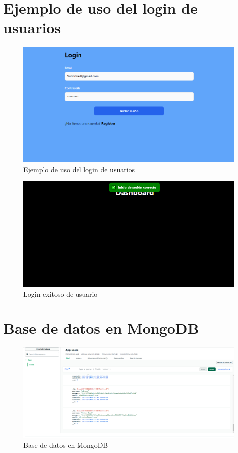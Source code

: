 \documentclass[12pt]{article}
\begin{document}
\section{Ejemplo de uso del login de usuarios}
\begin{figure}[H]
    \centering
    \includegraphics[width=1\textwidth]{./img/Login-example.png}
    \caption{Ejemplo de uso del login de usuarios}
    \label{fig:my_label}
\end{figure}

\begin{figure}[H]
    \centering
    \includegraphics[width=1\textwidth]{./img/Login-successfully.png}
    \caption{Login exitoso de usuario}
    \label{fig:my_label}
\end{figure}




\section{Base de datos en MongoDB}
\begin{figure}[H]
    \centering
    \includegraphics[width=1\textwidth]{./img/DB-MongoDB.png}
    \caption{Base de datos en MongoDB}
    \label{fig:my_label}
\end{figure}
\end{document}
